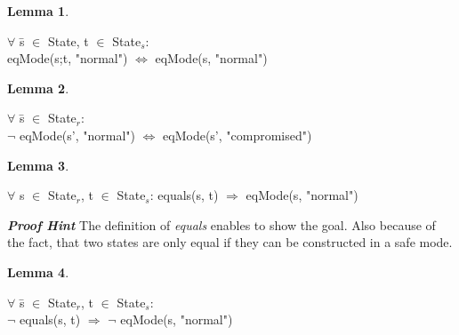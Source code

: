 \documentclass[conference]{IEEEtran}
\newtheorem{lem}{Lemma}
\begin{document}
\begin{lem} \end{lem} \begin{tabbing} $\forall$ \=s $\in$ State, t $\in$ State$_s$: \\\>eqMode(s;t, "normal") $\Leftrightarrow$ eqMode(s, "normal")
\end{tabbing}
\begin{lem} \end{lem} 
\begin{tabbing}
$\forall$ \=s $\in$ State$_r$: \\\>$\neg$ eqMode(s', "normal") $\Leftrightarrow$ eqMode(s', "compromised")\end{tabbing}
\begin{lem}\end{lem} \begin{tabbing} $\forall$ s $\in$ State$_r$, t $\in$ State$_s$: equals(s, t) $\Rightarrow$ eqMode(s, "normal")\end{tabbing}
\textbf{\em Proof Hint}
The definition of \emph{equals} enables to show the goal. Also because of the fact, that two states are only equal if they can be constructed in a safe mode.
\begin{lem} \end{lem}

\begin{tabbing} $\forall$ \=s $\in$ State$_r$, t $\in$ State$_s$: \\\>$\neg$ equals(s, t) $\Rightarrow$ $\neg$ eqMode(s, "normal") \end{tabbing}
\end{document}
